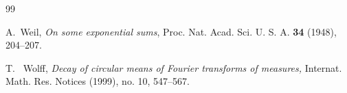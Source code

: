 \documentclass[a4paper,11pt]{amsart}
\numberwithin{equation}{section}
\begin{document}
\begin{thebibliography}{99}





 A.~Weil, \emph{On some exponential sums}, Proc. Nat. Acad. Sci. U. S. A. \textbf{34} (1948), 204--207.

 T.~ Wolff, \emph{Decay of circular means of Fourier transforms of measures,} Internat. Math. Res. Notices (1999), no. 10, 547--567.








\end{thebibliography}
\end{document}
